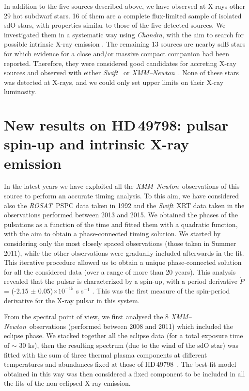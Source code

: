 \documentclass[USenglish,twocolumn]{article}
\def\XMM{{\em XMM--Newton}}
\def\ROSAT{{\em ROSAT}}
\def\Chandra{{\em Chandra}}
\def\Swift{{\em Swift}}
\def\HDone{HD\,49798}
\def\pdot {\dot P}
\begin{document}
In addition to the five sources described above, we have observed at X-rays other 29 hot subdwarf stars. 16 of them are a complete flux-limited sample of isolated sdO stars, with properties similar to those of the five detected sources. We investigated them in a systematic way using \Chandra, with the aim to search for possible intrinsic X-ray emission \citep{LaPalombara+14}. The remaining 13 sources are nearby sdB stars for which evidence for a close and/or massive compact companion had been reported. Therefore, they were considered good candidates for accreting X-ray sources and observed with either \Swift\ \citep{Mereghetti+11a} or \XMM\ \citep{Mereghetti+14}. None of these stars was detected at X-rays, and we could only set upper limits on their X-ray luminosity.

\section{New results on \HDone: pulsar spin-up and intrinsic X-ray emission}

In the latest years we have exploited all the \XMM\ observations of this source to perform an accurate timing analysis. To this aim, we have considered also the \ROSAT\ PSPC data taken in 1992 and the \Swift\ XRT data taken in the observations performed between 2013 and 2015. We obtained the phases of the pulsations as a function of the time and fitted them with a quadratic function, with the aim to obtain a phase-connected timing solution. We started by considering only the most closely spaced observations (those taken in Summer 2011), while the other observations were gradually included afterwards in the fit. This iterative procedure allowed us to obtain a unique phase-connected solution for all the considered data (over a range of more than 20 years). This analysis revealed that the pulsar is characterized by a spin-up, with a period derivative $\pdot$ = (-2.15 $\pm$ 0.05)$\times 10^{-15}$ s s$^{-1}$ \citep{Mereghetti+16}. This was the first measure of the spin-period derivative for the X-ray pulsar in this system.

From the spectral point of view, we first analysed the 8 \XMM\ observations (performed between 2008 and 2011) which included the eclipse phase. We stacked together all the eclipse data (for a total exposure time of $\sim$ 30 ks), then the resulting spectrum (due to the wind of the sdO star) was fitted with the sum of three thermal plasma components \citep{Mewe+85} at different temperatures and abundances fixed at those of \HDone\ \citep{MereghettiLaPalombara16}. The best-fit model obtained in this way was then considered a fixed component to be included in all the fits of the non-eclipsed X-ray emission.
\end{document}
